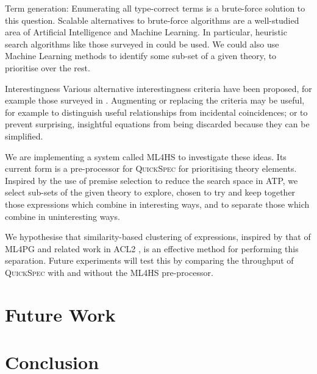 \documentclass[]{article}
\begin{document}
\begin{description}
\item{Term generation}:
  Enumerating all type-correct terms is a brute-force solution to this question.
  Scalable alternatives to brute-force algorithms are a well-studied area of
  Artificial Intelligence and Machine Learning. In particular, heuristic
  search algorithms like those surveyed in \cite{blum2011hybrid} could be used.
  We could also use Machine Learning methods to identify some sub-set of a given
  theory, to prioritise over the rest.
\item{Interestingness}
  Various alternative interestingness criteria have been proposed, for
  example those surveyed in \cite{geng2006interestingness}. Augmenting or
  replacing the criteria may be useful, for example to distinguish useful
  relationships from incidental coincidences; or to prevent surprising,
  insightful equations from being discarded because they can be simplified.
\end{description}

We are implementing a system called \textsc{ML4HS} to investigate these ideas.
Its current form is a pre-processor for \textsc{QuickSpec} for prioritising
theory elements. Inspired by the use of premise selection
\cite{kuhlwein2012overview} to reduce the search space in ATP,
we select sub-sets of the given theory to explore, chosen to try and keep
together those expressions which combine in interesting ways, and to separate
those which combine in uninteresting ways.

We hypothesise that similarity-based clustering of expressions, inspired by that
of \textsc{ML4PG} \cite{journals/corr/abs-1212-3618} and related work in ACL2
\cite{heras2013proof}, is an effective method for performing this separation.
Future experiments will test this by comparing the throughput of
\textsc{QuickSpec} with and without the \textsc{ML4HS} pre-processor.



\section{Future Work}
\label{future}

\iffalse
QuickSpec: extend or extinguish?

Improve and find other use cases/scenarios for clustering and feature extraction

Other directions for Theory Exploration?

How about systems based on term rewriting, logic programming, etc.?
\fi

\section{Conclusion}
\label{conclusion}



\end{document}
